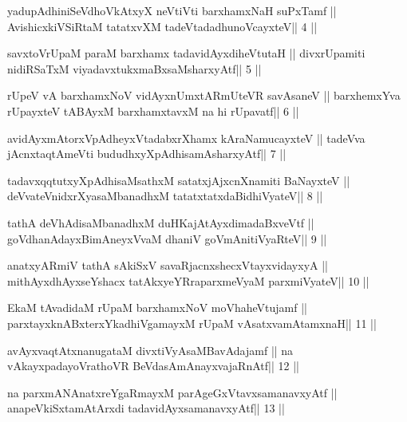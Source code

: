 \begin{shl}
yadupAdhiniSeVdhoVkAtxyX neVtiVti barxhamxNaH suPxTamf ||
AvishicxkiVSiRtaM tatatxvXM tadeVtadadhunoVcayxteV\hfill || 4 ||
\end{shl}

\begin{shl}
savxtoV\s rUpaM paraM barxhamx tadavidAyxdiheVtutaH ||
divxrUpamiti nidiRSaTxM viyadavxtukxmaBxsaMsharxyAtf\hfill || 5 ||
\end{shl}

\begin{shl}
rUpeV vA barxhamxNoV vidAyxnUmxtARmUteVR savAsaneV ||
barxhemxYva rUpayxteV tABAyxM barxhamxtavxM na hi rUpavatf\hfill || 6 ||
\end{shl}

\begin{shl}
avidAyxmAtorxVpAdheyxVtadabxrXhamx kAraNamucayxteV ||
tadeVva jAcnxtaqtAmeVti bududhxyXpAdhisamAsharxyAtf\hfill || 7 ||
\end{shl}

\begin{shl}
tadavxqqtutxyXpAdhisaMsathxM satatxjAjxcnXnamiti BaNayxteV ||
deVvateVnidxrXyasaMbanadhxM tatatxtatxdaBidhiVyateV\hfill || 8 ||
\end{shl}

\begin{shl}
tathA deVhAdisaMbanadhxM duHKajAtAyxdimadaBxveVtf ||
goVdhanAdayxBimAneyxVvaM dhaniV goVmAnitiVyaRteV\hfill || 9 ||
\end{shl}

\begin{shl}
anatxyARmiV tathA sAkiSxV savaRjacnxshecxVtayxvidayxyA ||
mithAyxdhAyxseYshacx tatAkxyeYRraparxmeVyaM parxmiVyateV\hfill || 10 ||
\end{shl}

\begin{shl}
EkaM tAvadidaM rUpaM barxhamxNoV moVhaheVtujamf ||
parxtayxknABxterxYkadhiVgamayxM rUpaM vAsatxvamAtamxnaH\hfill || 11 ||
\end{shl}

\begin{shl}
avAyxvaqtAtxnanugataM divxtiVyAsaMBavAdajamf ||
na vAkayxpadayoVrathoVR BeVdasAmAnayxvajaRnAtf\hfill || 12 ||
\end{shl}

\begin{shl}
na parxmANAnatxreYgaRmayxM parAgeGxVtavxsamanavxyAtf ||
anapeVkiSxtamAtArxdi tadavidAyxsamanavxyAtf\hfill || 13 ||
\end{shl}

